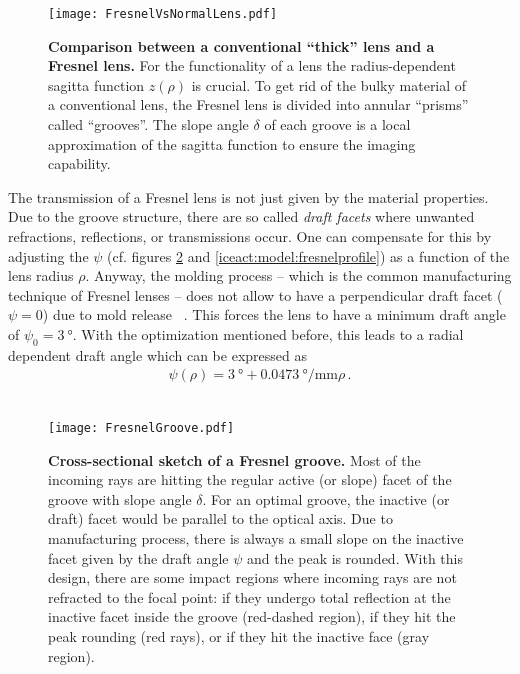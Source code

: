 \begin{figure}[H]
	\centering
	\texttt{[image: FresnelVsNormalLens.pdf]}
	\caption[Comparison conventional vs. Fresnel lens]{\textbf{Comparison between a conventional \enquote{thick} lens and a Fresnel lens.} \cite{famous:eichler} For the functionality of a lens the radius-dependent sagitta function $z(\rho)$ is crucial. To get rid of the bulky material of a conventional lens, the Fresnel lens is divided into annular \enquote{prisms} called \enquote{grooves}. The slope angle $\delta$ of each groove is a local approximation of the sagitta function to ensure the imaging capability.}
	\label{iceact:model:fresnelvsthick}	
\end{figure}
\newpage
The transmission of a Fresnel lens is not just given by the material properties. Due to the groove structure, there are so called \textit{draft facets} where unwanted refractions, reflections, or transmissions occur. One can compensate for this by adjusting the  $\psi$ (cf. figures \ref{iceact:model:fresnelgroove} and \ref{iceact:model:fresnelprofile}) as a function of the lens radius $\rho$. Anyway, the molding process -- which is the common manufacturing technique of Fresnel lenses -- does not allow to have a perpendicular draft facet ($\psi = 0$) due to mold release ~\cite{iceact:fresnellens:design}. This forces the lens to have a minimum draft angle of $\psi_0 = \SI{3}{\degree}$. With the optimization mentioned before, this leads to a radial dependent draft angle which can be expressed as \cite{famous:eichler, famous:niggemann}
\begin{align}
\psi(\rho) = \SI{3}{\degree} + \SI{0.0473}{\degree\per\milli\meter}\rho\,.
\label{eq:draft_angle}
\end{align}\\

\begin{figure}[H]
	\centering
	\texttt{[image: FresnelGroove.pdf]}
	\caption[Fresnel groove]{\textbf{Cross-sectional sketch of a Fresnel groove.} \cite{famous:eichler} Most of the incoming rays are hitting the regular active (or slope) facet of the groove with slope angle $\delta$. For an optimal groove, the inactive (or draft) facet would be parallel to the optical axis. Due to manufacturing process, there is always a small slope on the inactive facet given by the draft angle $\psi$ and the peak is rounded. With this design, there are some impact regions where incoming rays are not refracted to the focal point: if they undergo total reflection at the inactive facet inside the groove (red-dashed region), if they hit the peak rounding (red rays), or if they hit the inactive face (gray region).}
	\label{iceact:model:fresnelgroove}	
\end{figure}

